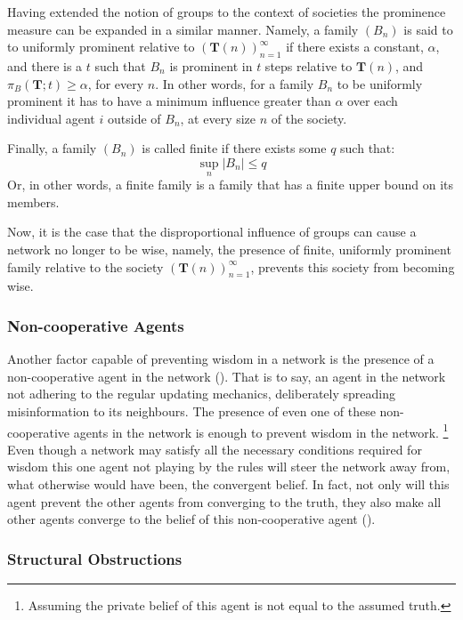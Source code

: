 \documentclass{article}
\newcommand{\T}{\textbf{T}}
\newcommand{\Soc}{(\T(n))^{\infty}_{n=1}}
\begin{document}
Having extended the notion of groups to the context of societies the prominence measure can be expanded in a similar manner. Namely, a family $(B_n)$ is said to to uniformly prominent relative to $\Soc$ if there exists a constant, $\alpha$, and there is a $t$ such that $B_n$ is prominent in $t$ steps relative to $\T(n)$, and $\pi_B(\textbf{T}; t) \geq \alpha$, for every $n$. In other words, for a family $B_n$ to be uniformly prominent it has to have a minimum influence greater than $\alpha$ over each individual agent $i$ outside of $B_n$, at every size $n$ of the society.

\noindent Finally, a family $(B_n)$ is called finite if there exists some $q$ such that:
\begin{equation*}
    \sup_n |B_n| \leq q
\end{equation*}
Or, in other words, a finite family is a family that has a finite upper bound on its members.

Now, it is the case that the disproportional influence of groups can cause a network no longer to be wise, namely, the presence of finite, uniformly prominent family relative to the society $\Soc$, prevents this society from becoming wise.

\subsubsection{Non-cooperative Agents}
\label{non-coop}
Another factor capable of preventing wisdom in a network is the presence of a non-cooperative agent in the network (\cite{amir2021robust}). That is to say, an agent in the network not adhering to the regular updating mechanics, deliberately spreading misinformation to its neighbours. The presence of even one of these non-cooperative agents in  the network is enough to prevent wisdom in the network. \footnote{Assuming the private belief of this agent is not equal to the assumed truth.} Even though a network may satisfy all the necessary conditions required for wisdom this one agent not playing by the rules will steer the network away from, what otherwise would have been, the convergent belief. In fact, not only will this agent prevent the other agents from converging to the truth, they also make all other agents converge to the belief of this non-cooperative agent (\cite{amir2021robust}).

\subsubsection{Structural Obstructions}
\end{document}

